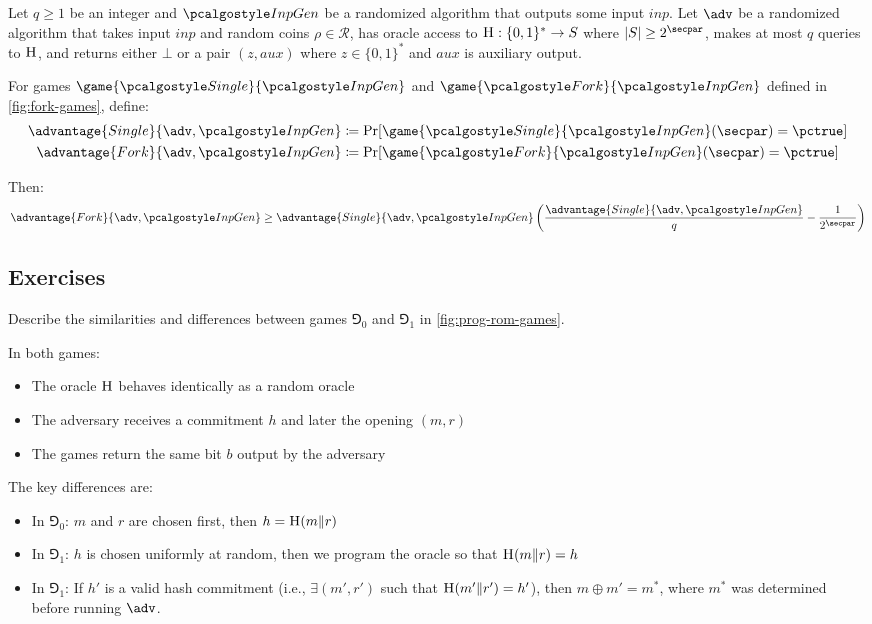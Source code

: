 \begin{lemma}\label{lem:fork}
  Let $q \geq 1$ be an integer and $\algo{InpGen}$ be a randomized algorithm that outputs some input $\mathit{inp}$.
  Let $\adv$ be a randomized algorithm that takes input $\mathit{inp}$ and random coins $\rho \in \mathcal{R}$, has oracle access to ${\normalfont\textsc{H}}: \{0,1\}^* \rightarrow S$ where $|S| \geq 2^\secpar$, makes at most $q$ queries to ${\normalfont\textsc{H}}$, and returns either $\bot$ or a pair $(z, \mathit{aux})$ where $z \in \{0,1\}^*$ and $\mathit{aux}$ is auxiliary output.
  
  For games $\game{\algo{Single}}{\algo{InpGen}}$ and $\game{\algo{Fork}}{\algo{InpGen}}$ defined in \autoref{fig:fork-games}, define:
  \begin{align*}
    \advantage{Single}{\adv, \algo{InpGen}} &\defeq \Pr[\game{\algo{Single}}{\algo{InpGen}}(\secpar) = \pctrue] \\
    \advantage{Fork}{\adv, \algo{InpGen}} &\defeq \Pr[\game{\algo{Fork}}{\algo{InpGen}}(\secpar) = \pctrue]
  \end{align*}
  
  Then:
  \[
  \advantage{Fork}{\adv, \algo{InpGen}} \geq \advantage{Single}{\adv, \algo{InpGen}} \left( \frac{\advantage{Single}{\adv, \algo{InpGen}}}{q} - \frac{1}{2^\secpar} \right)
  \]
\end{lemma}

\subsection{Exercises}

\begin{exercise}
  Describe the similarities and differences between games $\Game_0$ and $\Game_1$ in \autoref{fig:prog-rom-games}.
\end{exercise}

\ifsolutions
\begin{mysolution}
  In both games:
  \begin{itemize}
    \item The oracle ${\normalfont\textsc{H}}$ behaves identically as a random oracle
    \item The adversary receives a commitment $h$ and later the opening $(m, r)$
    \item The games return the same bit $b$ output by the adversary
  \end{itemize}
  
  The key differences are:
  \begin{itemize}
    \item In $\Game_0$: $m$ and $r$ are chosen first, then $h = {\normalfont\textsc{H}}(m \| r)$
    \item In $\Game_1$: $h$ is chosen uniformly at random, then we program the oracle so that ${\normalfont\textsc{H}}(m \| r) = h$
    \item In $\Game_1$: If $h'$ is a valid hash commitment (i.e., $\exists (m', r')$ such that ${\normalfont\textsc{H}}(m' \| r') = h'$), then $m \oplus m' = m^*$, where $m^*$ was determined before running $\adv$.
  \end{itemize}
\end{mysolution}
\fi

